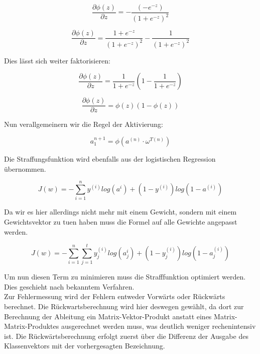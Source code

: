 \documentclass[11pt]{article} %
\begin{document}
\begin{equation}
\frac{\partial \phi(z)}{\partial z} = -\frac{(-e^{-z})}{(1+e^{-z})^2} 
\end{equation}

\begin{equation}
\frac{\partial \phi(z)}{\partial z} = \frac{1+e^{-z}}{(1+e^{-z})^2} -\frac{1}{(1+e^{-z})^2} 
\end{equation}

Dies lässt sich weiter faktorisieren:

\begin{equation}
\frac{\partial \phi(z)}{\partial z} = \frac{1}{1+e^{-z}}(1-\frac{1}{1+e^{-z}})
\end{equation}

\begin{equation}
\frac{\partial \phi(z)}{\partial z} = \phi(z)(1-\phi(z))
\end{equation}

Nun verallgemeinern wir die Regel der Aktivierung:

\begin{equation}
 a^{n+1}_1 = \phi(a^{(n)} \cdot \omega^{T (n)} )
\end{equation}
 
Die Straffungsfunktion wird ebenfalls aus der logistischen Regression übernommen. 

\begin{equation}
J(w) = -\sum_{i=1}^n y^{(i)} log(a^{i}) + (1-y^{(i)})log(1-a^{(i)})
\end{equation}

Da wir es hier allerdings nicht mehr mit einem Gewicht, sondern mit einem Gewichtsvektor zu tuen haben muss die Formel auf alle Gewichte angepasst werden.

\begin{equation}
J(w) = -\sum_{i=1}^n \sum_{j=1}^t y_j^{(i)} log(a_j^{i}) + (1-y^{(i)}_j)log(1-a_j^{(i)})
\end{equation}

Um nun diesen Term zu minimieren muss die Strafffunktion optimiert werden. Dies geschieht nach bekanntem Verfahren.\\
Zur Fehlermessung wird der Fehlern entweder Vorwärts oder Rückwärts berechnet. Die Rückwartsberechnung wird hier deswegen gewählt, da dort zur Berechnung der Ableitung ein Matrix-Vektor-Produkt anstatt eines Matrix-Matrix-Produktes ausgerechnet werden muss, was deutlich weniger rechenintensiv ist. Die Rückwärtsberechnung erfolgt zuerst über die Differenz der Ausgabe des Klassenvektors mit der vorhergesagten Bezeichnung.
\end{document}
